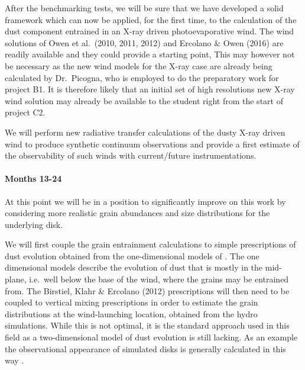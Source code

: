 \documentclass[10pt,fleqn,twoside]{article}
\begin{document}
After the benchmarking tests, we will be sure that we have developed a
solid framework which can now be applied, for the
first time, to the calculation of the dust component entrained in an
X-ray driven photoevaporative wind. The wind solutions of Owen et
al.\ (2010, 2011, 2012) and Ercolano \& Owen (2016) are readily
available and they could provide a starting point,  This may however
not be necessary as the new wind models for the X-ray case
are already being calculated by Dr.\ Picogna, who is employed to do the
preparatory work for project B1. It is therefore likely that an
initial set of high resolutions new X-ray wind solution may already be
available to the student right from the start of project C2.
 

We will perform new radiative transfer calculations of the dusty
X-ray driven wind to produce synthetic continuum observations and
provide a first estimate of the observability of such winds with
current/future instrumentations. 

\paragraph{Months 13-24}
 
At this point we will be in a position to significantly improve on
this work by considering more realistic grain abundances and size
distributions for the underlying disk. 

We will first couple the grain entrainment calculations to simple
prescriptions of dust  evolution \citep[e.g.,][]{2012A&A...539A.148B}
obtained from the one-dimensional models of
\citet{2010A&A...513A..79B}. The one dimensional models describe the
evolution of dust that is mostly in the mid-plane, i.e.\ well below the
base of the wind, where the grains may be entrained from. The
Birstiel, Klahr \& Ercolano (2012) prescriptions will then need to be
coupled to vertical mixing prescriptions \citep{2009A&A...496..597F} in order to
estimate the grain distributions at the wind-launching location,
obtained from the hydro simulations. While this is not optimal, it is
the standard approach used in this field as a two-dimensional model of
dust evolution is still lacking. As an example the observational
appearance of simulated disks is generally calculated in this way
\citep[e.g.,][]{2015ApJ...813L..14B}. 
\end{document}
